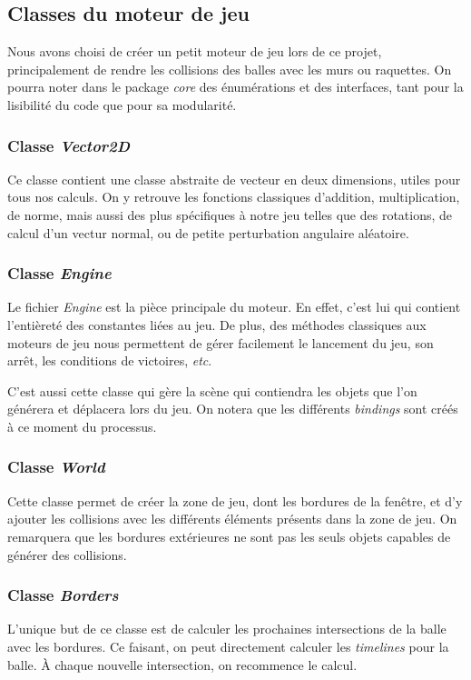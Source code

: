 \documentclass[a4paper,10pt]{article}
\theoremstyle{definition}
\begin{document}
    \subsection{Classes du moteur de jeu}
    Nous avons choisi de créer un petit moteur de jeu lors de ce projet, principalement de rendre les collisions des balles avec les murs ou raquettes. On pourra noter dans le package \emph{core} des énumérations et des interfaces, tant pour la lisibilité du code que pour sa modularité.
    	
	\subsubsection*{Classe \emph{Vector2D}}
	Ce classe contient une classe abstraite de vecteur en deux dimensions, utiles pour tous nos calculs. On y retrouve les fonctions classiques d'addition, multiplication, de norme, mais aussi des plus spécifiques à notre jeu telles que des rotations, de calcul d'un vectur normal, ou de petite perturbation angulaire aléatoire.
	
	\subsubsection*{Classe \emph{Engine}}
	Le fichier \emph{Engine} est la pièce principale du moteur. En effet, c'est lui qui contient l'entièreté des constantes liées au jeu. De plus, des méthodes classiques aux moteurs de jeu nous permettent de gérer facilement le lancement du jeu, son arrêt, les conditions de victoires, \emph{etc}.
	
	C'est aussi cette classe qui gère la scène qui contiendra les objets que l'on générera et déplacera lors du jeu. On notera que les différents \emph{bindings} sont créés à ce moment du processus.
	
        \subsubsection*{Classe \emph{World}}
        Cette classe permet de créer la zone de jeu, dont les bordures de la fenêtre, et d'y ajouter les collisions avec les différents éléments présents dans la zone de jeu. On remarquera que les bordures extérieures ne sont pas les seuls objets capables de générer des collisions. 
        
        \subsubsection*{Classe \emph{Borders}}
        L'unique but de ce classe est de calculer les prochaines intersections de la balle avec les bordures. Ce faisant, on peut directement calculer les \emph{timelines} pour la balle. À chaque nouvelle intersection, on recommence le calcul.
        
\end{document}
